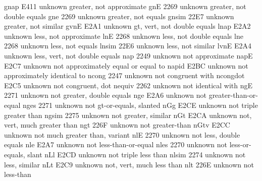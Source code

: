 %
%

 gnap                    E411 {unknown} greater, not approximate
 gnE                     2269 {unknown} greater, not double equals
 gne                     2269 {unknown} greater, not equals
 gnsim                   22E7 {unknown} greater, not similar
 gvnE                    E2A1 {unknown} gt, vert, not double equals
 lnap                    E2A2 {unknown} less, not approximate
 lnE                     2268 {unknown} less, not double equals
 lne                     2268 {unknown} less, not equals
 lnsim                   22E6 {unknown} less, not similar
 lvnE                    E2A4 {unknown} less, vert, not double equals
 nap                     2249 {unknown} not approximate
 napE                    E2C7 {unknown} not approximately equal or equal to
 napid                   E2BC {unknown} not approximately identical to
 ncong                   2247 {unknown} not congruent with
 ncongdot                E2C5 {unknown} not congruent, dot
 nequiv                  2262 {unknown} not identical with
 ngE                     2271 {unknown} not greater, double equals
 nge                     E2A6 {unknown} not greater-than-or-equal
 nges                    2271 {unknown} not gt-or-equals, slanted
 nGg                     E2CE {unknown} not triple greater than
 ngsim                   2275 {unknown} not greater, similar
 nGt                     E2CA {unknown} not, vert, much greater than
 ngt                     226F {unknown} not greater-than
 nGtv                    E2CC {unknown} not much greater than, variant
 nlE                     2270 {unknown} not less, double equals
 nle                     E2A7 {unknown} not less-than-or-equal
 nles                    2270 {unknown} not less-or-equals, slant
 nLl                     E2CD {unknown} not triple less than
 nlsim                   2274 {unknown} not less, similar
 nLt                     E2C9 {unknown} not, vert, much less than
 nlt                     226E {unknown} not less-than
